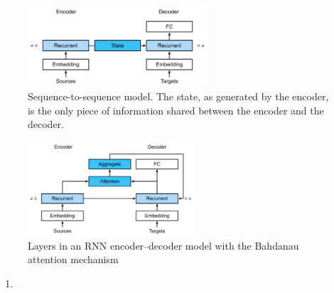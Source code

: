 \begin{table}[H]
    \begin{minipage}{0.49\linewidth}
        \begin{figure}[H]
            \centering
            \includegraphics[width=\linewidth, height=3cm, keepaspectratio]{Pictures/deep_neural_networks/seq2seq-state.jpg}
            \caption*{Sequence-to-sequence model. The state, as generated by the encoder, is the only piece of information shared between the encoder and the decoder.}
        \end{figure}
    \end{minipage}
    \hfill
    \begin{minipage}{0.49\linewidth}
        \begin{figure}[H]
            \centering
            \includegraphics[width=\linewidth, height=3.5cm, keepaspectratio]{Pictures/deep_neural_networks/seq2seq-details-attention.jpg}
            \caption*{Layers in an RNN encoder–decoder model with the Bahdanau attention mechanism}
        \end{figure}
    \end{minipage}
\end{table}

\begin{enumerate}
    \item 

\end{enumerate}















